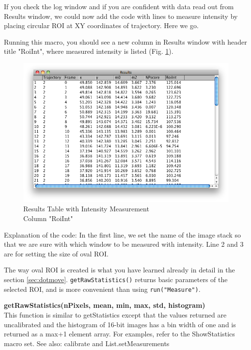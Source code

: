 \documentclass[11pt,a4paper,oneside]{report}
\newenvironment{indentCom}%
{\begin{list}{}%
         {\setlength{\leftmargin}{1em}}%
         \item[]%
}
{\end{list}}
\newcommand{\ilcom}[1]{\texttt{\small#1}}
\begin{document}
If you check the log window and if you are confident with data read out from Results window, 
we could now add the code with lines to measure intensity by 
placing circular ROI at XY coordinates of trajectory. Here we go. 



Running this macro, you should see a new column in Results window with header title "RoiInt", 
where measured intensity is listed (Fig. \ref{fig:PTResultsTableAfter}).

\begin{figure}[htbp]
\begin{center}
\includegraphics[scale=0.5]{fig/fig261_resultstableAddedWithInt.png}
\caption{Results Table with Intensity Measurement \\Column "RoiInt"}
\label{fig:PTResultsTableAfter}
\end{center}
\end{figure}

Explanation of the code: In the first line, 
we set the name of the image stack so that we are sure with which window to be measured with intensity. 
Line 2 and 3 are for setting the size of oval ROI. 

The way oval ROI is created is what you have learned already in detail in the section 
\ref{sec:dotmove}. \ilcom{getRawStatistics()} returns basic parameters of the selected ROI, 
and is more convenient than using \ilcom{run("Measure")}. 

\begin{indentCom}
\textbf{getRawStatistics(nPixels, mean, min, max, std, histogram)}\\
This function is similar to getStatistics except that the values returned 
are uncalibrated and the histogram of 16-bit images has a bin width of one and is returned 
as a max+1 element array. For examples, refer to the ShowStatistics macro set. 
See also: calibrate and List.setMeasurements
\end{indentCom} 
\end{document}
